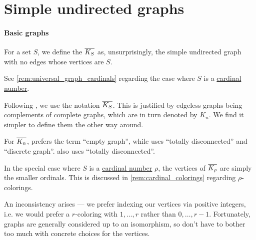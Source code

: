 \section{Simple undirected graphs}\label{sec:simple_undirected_graphs}

\paragraph{Basic graphs}

\begin{definition}\label{def:edgeless_graph}\mimprovised
  For a set \( S \), we define the  \( \oline{K_S} \) as, unsurprisingly, the simple undirected graph with no edges whose vertices are \( S \).
\end{definition}
\begin{comments}
  \item See \cref{rem:universal_graph_cardinals} regarding the case where \( S \) is a \hyperref[def:cardinal]{cardinal number}.

  \item Following , we use the notation \( \oline{K_S} \). This is justified by edgeless graphs being \hyperref[def:graph_complement]{complements} of \hyperref[def:complete_graph]{complete graphs}, which are in turn denoted by \( K_n \). We find it simpler to define them the other way around.

  \item For \( \oline{K_n} \),  prefers the term \enquote{empty graph}, while  uses \enquote{totally disconnected} and \enquote{discrete graph}.  also uses \enquote{totally disconnected}.
\end{comments}

\begin{remark}\label{rem:universal_graph_cardinals}
  In the special case where \( S \) is a \hyperref[def:cardinal]{cardinal number} \( \rho \), the vertices of \( \oline{K_\rho} \) are simply the smaller ordinals. This is discussed in \cref{rem:cardinal_colorings} regarding \( \rho \)-colorings.

  An inconsistency arises --- we prefer indexing our vertices via positive integers, i.e. we would prefer a \( r \)-coloring with \( 1, \ldots, r \) rather than \( 0, \ldots, r - 1 \). Fortunately, graphs are generally considered up to an isomorphism, so don't have to bother too much with concrete choices for the vertices.
\end{remark}

